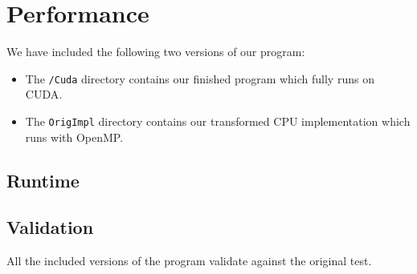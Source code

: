 \section{Performance}
We have included the following two versions of our program:
\begin{itemize}
\item The \verb!/Cuda! directory contains our finished program which fully runs on CUDA.
\item The \verb!OrigImpl! directory contains our transformed CPU implementation which runs with OpenMP.
\end{itemize}
\subsection{Runtime}

\subsection{Validation} All the included versions of the program validate against the original test.


